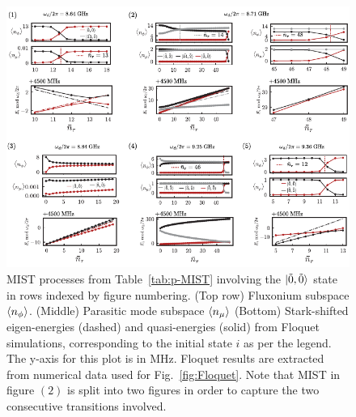 \documentclass[%
reprint,
superscriptaddress,
 amsmath,amssymb,
 aps,
 prx,
longbibliography,
floatfix,
]{revtex4-2}
\newcommand{\sh}[1]{{\color{blue}{{}[SS: #1]}}}%
\begin{document}
\begin{figure}
    \centering
    \includegraphics[width=1.0\textwidth]{Supp_Fig/Trans0.pdf}
    \caption{MIST processes from Table~\ref{tab:p-MIST} involving the $\ket{\tilde{0},\tilde{0}}$ state in rows indexed by figure numbering. (Top row) Fluxonium subspace $\braket{n_\phi}$. (Middle) Parasitic mode subspace $\braket{n_\mu}$ (Bottom) Stark-shifted eigen-energies (dashed) and quasi-energies (solid) from Floquet simulations, corresponding to the initial state $i$ as per the legend. The y-axis for this plot is in MHz. Floquet results are extracted from numerical data used for Fig.~\ref{fig:Floquet}. Note that MIST in figure $(2)$ is split into two figures in order to capture the two consecutive transitions involved.}
    \label{fig:Trans0}
\end{figure}
\end{document}
